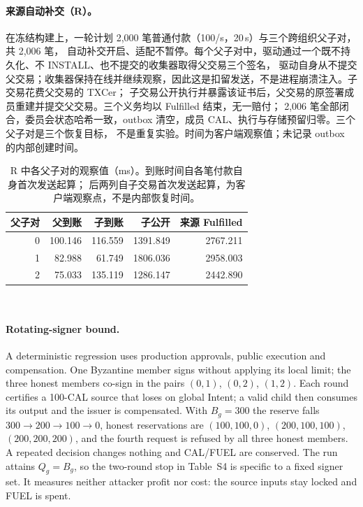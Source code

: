 \paragraph{来源自动补交（R）。}
在冻结构建上，一轮计划 2,000 笔普通付款（100/s，20\,s）与三个跨组织父子对，共 2,006 笔，
自动补交开启、适配不暂停。每个父子对中，驱动通过一个既不持久化、不 INSTALL、也不提交的收集器取得父交易三个签名，
驱动自身从不提交父交易；收集器保持在线并继续观察，因此这是扣留发送，不是进程崩溃注入。子交易花费父交易的 TXCer；
子交易公开执行并暴露该证书后，父交易的原签署成员重建并提交父交易。三个义务均以 Fulfilled 结束，无一赔付；
2,006 笔全部闭合，委员会状态哈希一致，outbox 清空，成员 CAL、执行与存储预留归零。三个父子对是三个恢复目标，
不是重复实验。时间为客户端观察值；未记录 outbox 的内部创建时间。
 
\begin{table}[!t]
\caption{R 中各父子对的观察值（ms）。到账时间自各笔付款自身首次发送起算；
后两列自子交易首次发送起算，为客户端观察点，不是内部恢复时间。}
\label{tab:sup-r-cn}
\centering\footnotesize
\begin{tabular}{@{}rrrrr@{}}
\hline
父子对 & 父到账 & 子到账 & 子公开 & 来源 Fulfilled \\
\hline
0 & 100.146 & 116.559 & 1391.849 & 2767.211 \\
1 &  82.988 &  61.749 & 1806.036 & 2958.003 \\
2 &  75.033 & 135.119 & 1286.147 & 2442.890 \\
\hline
\end{tabular}
\end{table}
 
\paragraph{Rotating-signer bound.}
A deterministic regression uses production approvals, public execution and
compensation. One Byzantine member signs without applying its local limit; the three
honest members co-sign in the pairs $(0,1)$, $(0,2)$, $(1,2)$. Each round certifies a
100-CAL source that loses on global Intent; a valid child then consumes its output and
the issuer is compensated. With $B_g=300$ the reserve falls $300\to200\to100\to0$,
honest reservations are $(100,100,0)$, $(200,100,100)$, $(200,200,200)$, and the fourth
request is refused by all three honest members. A repeated decision changes nothing and
CAL/FUEL are conserved. The run attains $Q_g=B_g$, so the two-round stop in
Table~S4 is specific to a fixed signer set. It measures neither attacker profit nor
cost: the source inputs stay locked and FUEL is spent.
 
